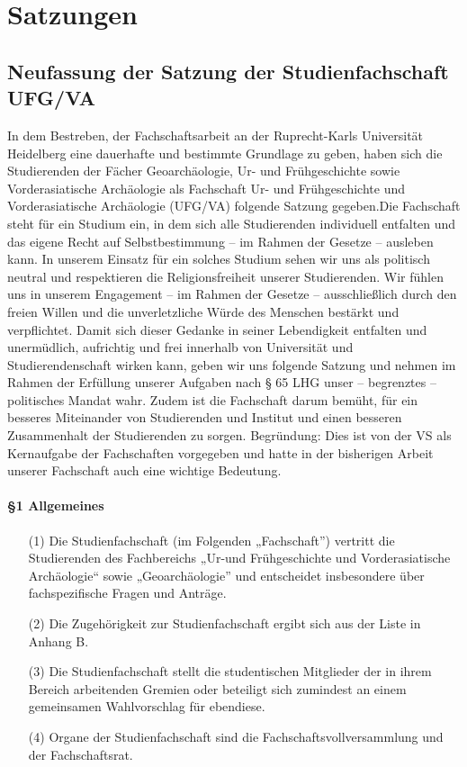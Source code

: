\section{Satzungen}
\subsection{Neufassung der Satzung der Studienfachschaft UFG/VA}
    \label{sec:appendix1}
    In dem Bestreben, der Fachschaftsarbeit an der Ruprecht-Karls Universität Heidelberg
    eine dauerhafte und bestimmte Grundlage zu geben, haben sich die Studierenden der
    Fächer Geoarchäologie, Ur- und Frühgeschichte sowie Vorderasiatische Archäologie als
    Fachschaft Ur- und Frühgeschichte und Vorderasiatische Archäologie (UFG/VA) folgende
    Satzung gegeben.\newline Die Fachschaft steht für ein Studium ein, in dem sich alle Studierenden individuell
    entfalten und das eigene Recht auf Selbstbestimmung – im Rahmen der Gesetze –
    ausleben kann. In unserem Einsatz für ein solches Studium sehen wir uns als politisch
    neutral und respektieren die Religionsfreiheit unserer Studierenden. Wir fühlen uns
    in unserem Engagement – im Rahmen der Gesetze – ausschließlich durch den freien
    Willen und die unverletzliche Würde des Menschen bestärkt und verpflichtet. Damit
    sich dieser Gedanke in seiner Lebendigkeit entfalten und unermüdlich, aufrichtig und
    frei innerhalb von Universität und Studierendenschaft wirken kann, geben wir uns
    folgende Satzung und nehmen im Rahmen der Erfüllung unserer Aufgaben nach § 65 LHG
    unser – begrenztes – politisches Mandat wahr. Zudem ist die Fachschaft darum bemüht,
    für ein besseres Miteinander von Studierenden und Institut und einen besseren
    Zusammenhalt der Studierenden zu sorgen. Begründung: Dies ist von der VS als
    Kernaufgabe der Fachschaften vorgegeben und hatte in der bisherigen Arbeit unserer
    Fachschaft auch eine wichtige Bedeutung.
    \\
    \paragraph{§1 Allgemeines}
    \begin{enumerate}
        \item[(1)] {Die Studienfachschaft (im Folgenden „Fachschaft”) vertritt die Studierenden des Fachbereichs „Ur-und Frühgeschichte und Vorderasiatische Archäologie“ sowie „Geoarchäologie” und entscheidet insbesondere über fachspezifische Fragen und Anträge.}
        \item[(2)] {Die Zugehörigkeit zur Studienfachschaft ergibt sich aus der Liste in Anhang B.}
        \item[(3)] {Die Studienfachschaft stellt die studentischen Mitglieder der in ihrem Bereich        arbeitenden Gremien oder beteiligt sich zumindest an einem gemeinsamen Wahlvorschlag        für ebendiese.}
        \item[(4)] {Organe der Studienfachschaft sind die Fachschaftsvollversammlung und der        Fachschaftsrat.}
    \end{enumerate}

